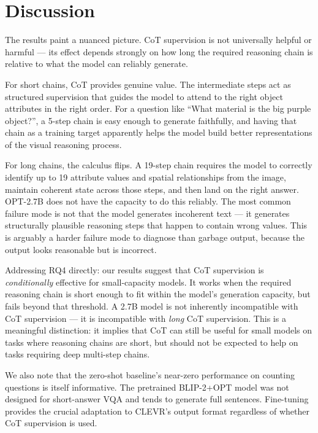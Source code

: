 \documentclass[11pt,twocolumn]{article}
\begin{document}
\section{Discussion}

The results paint a nuanced picture. CoT supervision is not universally helpful or harmful — its effect depends strongly on how long the required reasoning chain is relative to what the model can reliably generate.

For short chains, CoT provides genuine value. The intermediate steps act as structured supervision that guides the model to attend to the right object attributes in the right order. For a question like ``What material is the big purple object?'', a 5-step chain is easy enough to generate faithfully, and having that chain as a training target apparently helps the model build better representations of the visual reasoning process.

For long chains, the calculus flips. A 19-step chain requires the model to correctly identify up to 19 attribute values and spatial relationships from the image, maintain coherent state across those steps, and then land on the right answer. OPT-2.7B does not have the capacity to do this reliably. The most common failure mode is not that the model generates incoherent text — it generates structurally plausible reasoning steps that happen to contain wrong values. This is arguably a harder failure mode to diagnose than garbage output, because the output looks reasonable but is incorrect.

Addressing RQ4 directly: our results suggest that CoT supervision is \textit{conditionally} effective for small-capacity models. It works when the required reasoning chain is short enough to fit within the model's generation capacity, but fails beyond that threshold. A 2.7B model is not inherently incompatible with CoT supervision — it is incompatible with \textit{long} CoT supervision. This is a meaningful distinction: it implies that CoT can still be useful for small models on tasks where reasoning chains are short, but should not be expected to help on tasks requiring deep multi-step chains.

We also note that the zero-shot baseline's near-zero performance on counting questions is itself informative. The pretrained BLIP-2+OPT model was not designed for short-answer VQA and tends to generate full sentences. Fine-tuning provides the crucial adaptation to CLEVR's output format regardless of whether CoT supervision is used.
\end{document}
